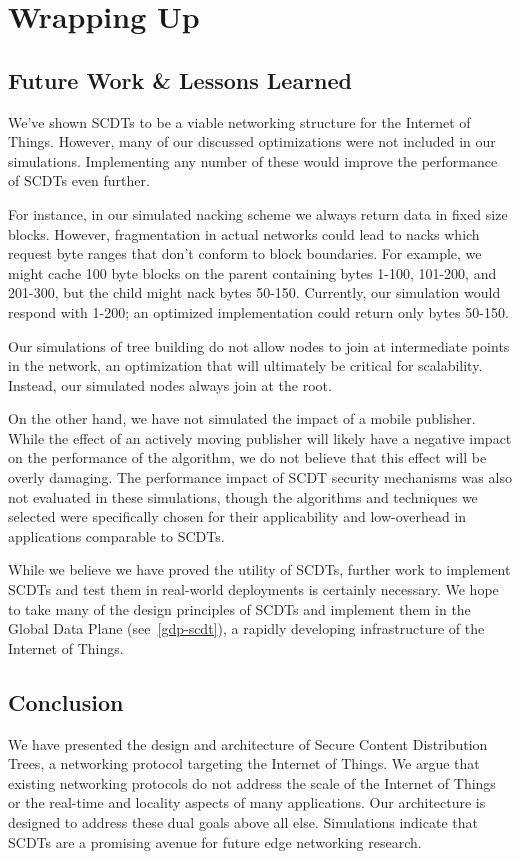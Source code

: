\chapter{Wrapping Up}

\section{Future Work \& Lessons Learned}
We've shown SCDTs to be a viable networking structure for the Internet of Things. However, many of our discussed optimizations were not included in our simulations. Implementing any number of these would improve the performance of SCDTs even further. 

For instance, in our simulated nacking scheme we always return data in fixed size blocks. However, fragmentation in actual networks could lead to nacks which request byte ranges that don't conform to block boundaries. For example, we might cache 100 byte blocks on the parent containing bytes 1-100, 101-200, and 201-300, but the child might nack bytes 50-150.  Currently, our simulation would respond with 1-200; an optimized implementation could return only bytes 50-150.

Our simulations of tree building do not allow nodes to join at intermediate points in the network, an optimization that will ultimately be critical for scalability. Instead, our simulated nodes always join at the root.

On the other hand, we have not simulated the impact of a mobile publisher. While the effect of an actively moving publisher will likely have a negative impact on the performance of the algorithm, we do not believe that this effect will be overly damaging. The performance impact of SCDT security mechanisms was also not evaluated in these simulations, though the algorithms and techniques we selected were specifically chosen for their applicability and low-overhead in applications comparable to SCDTs.

While we believe we have proved the utility of SCDTs, further work to implement SCDTs and test them in real-world deployments is certainly necessary. We hope to take many of the design principles of SCDTs and implement them in the Global Data Plane (see~\autoref{gdp-scdt}), a rapidly developing infrastructure of the Internet of Things.

\section{Conclusion}
We have presented the design and architecture of Secure Content Distribution Trees, a networking protocol targeting the Internet of Things. We argue that existing networking protocols do not address the scale of the Internet of Things or the real-time and locality aspects of many applications. Our architecture is designed to address these dual goals above all else. Simulations indicate that SCDTs are a promising avenue for future edge networking research.

